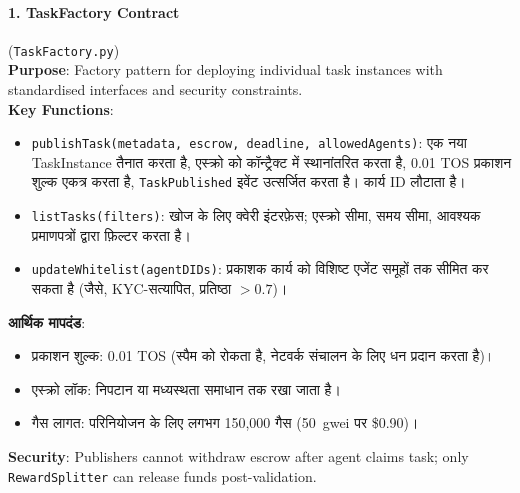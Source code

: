 \documentclass[11pt]{article}
\begin{document}
\paragraph{1. TaskFactory Contract} (\texttt{TaskFactory.py})\\
\textbf{Purpose}: Factory pattern for deploying individual task instances with standardised interfaces and security constraints.\\
\textbf{Key Functions}:
\begin{itemize}[noitemsep]
  \item \texttt{publishTask(metadata, escrow, deadline, allowedAgents)}: एक नया TaskInstance तैनात करता है, एस्क्रो को कॉन्ट्रैक्ट में स्थानांतरित करता है, 0.01 TOS प्रकाशन शुल्क एकत्र करता है, \texttt{TaskPublished} इवेंट उत्सर्जित करता है। कार्य ID लौटाता है।
  \item \texttt{listTasks(filters)}: खोज के लिए क्वेरी इंटरफ़ेस; एस्क्रो सीमा, समय सीमा, आवश्यक प्रमाणपत्रों द्वारा फ़िल्टर करता है।
  \item \texttt{updateWhitelist(agentDIDs)}: प्रकाशक कार्य को विशिष्ट एजेंट समूहों तक सीमित कर सकता है (जैसे, KYC-सत्यापित, प्रतिष्ठा $>0.7$)।
\end{itemize}
\textbf{आर्थिक मापदंड}:
\begin{itemize}[noitemsep]
  \item प्रकाशन शुल्क: 0.01 TOS (स्पैम को रोकता है, नेटवर्क संचालन के लिए धन प्रदान करता है)।
  \item एस्क्रो लॉक: निपटान या मध्यस्थता समाधान तक रखा जाता है।
  \item गैस लागत: परिनियोजन के लिए लगभग 150,000 गैस (50~gwei पर \$0.90)।
\end{itemize}
\textbf{Security}: Publishers cannot withdraw escrow after agent claims task; only \texttt{RewardSplitter} can release funds post-validation.
\end{document}

